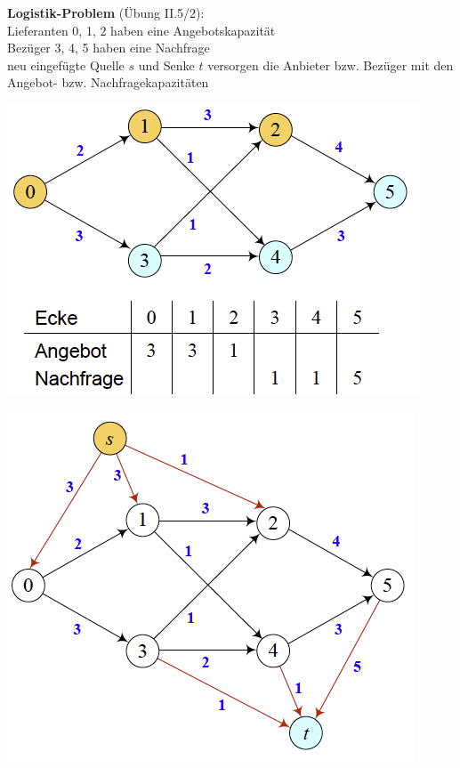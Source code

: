 \begin{minipage}{0.33\textwidth}
	\textbf{Logistik-Problem} (Übung II.5/2):\\
	
	Lieferanten 0, 1, 2 haben eine Angebotskapazität\\
	Bezüger 3, 4, 5 haben eine Nachfrage\\
	neu eingefügte Quelle $s$ und Senke $t$ versorgen die Anbieter bzw. Bezüger mit den Angebot- bzw. Nachfragekapazitäten
\end{minipage}
\begin{minipage}{0.33\textwidth}
	\includegraphics[width=\textwidth]{Content/Graphen/LogProb1.png}
\end{minipage}
\begin{minipage}{0.33\textwidth}	
	\includegraphics[width=\textwidth]{Content/Graphen/LogProb2.png}
\end{minipage}




